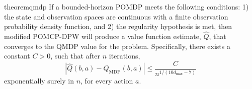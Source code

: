 \begin{restatable}{theorem}{qmdp}
    \label{thm:qmdp}
If a bounded-horizon POMDP meets the following conditions: 1) the state and observation spaces are continuous with a finite observation probability density function, and 2) the regularity hypothesis is met, then modified POMCP-DPW will produce a value function estimate, $\hat{Q}$, that converges to the QMDP value for the problem.
Specifically, there exists a constant $C>0$, such that after $n$ iterations,
\begin{equation*}
    \left| \hat{Q}(b,a) - Q_\text{MDP}(b,a) \right| \leq \frac{C}{n^{1/(10d_{\max}-7)}}
\end{equation*}
exponentially surely in $n$, for every action $a$.
\end{restatable}

